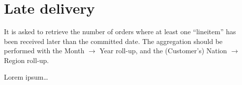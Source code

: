 

\section{Late delivery}

It is asked to retrieve the number of orders where at least one ``lineitem'' has been received later than the committed date.
The aggregation should be performed with the Month $\rightarrow$ Year roll-up, and the (Customer's) Nation $\rightarrow$ Region roll-up.

Lorem ipsum\dots